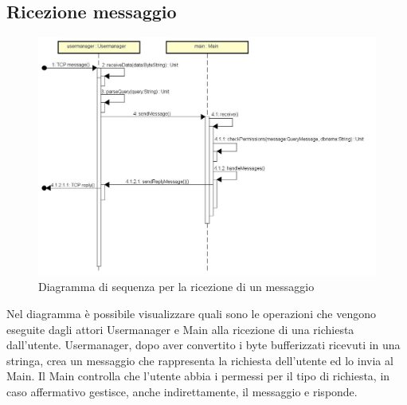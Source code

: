 \documentclass[a4paper]{article}
\begin{document}
       \subsection{Ricezione messaggio}
	\begin{figure}[H]
			\centering
			\includegraphics[width=\textwidth]{Sequenza/seqComandoUtente.jpg}
			\caption{Diagramma di sequenza per la ricezione di un messaggio}
		\end{figure}
		Nel diagramma è possibile visualizzare quali sono le operazioni che vengono eseguite dagli
attori Usermanager e Main alla ricezione di una richiesta dall'utente. Usermanager, dopo aver convertito
i byte bufferizzati ricevuti in una stringa, crea un messaggio che rappresenta la richiesta dell'utente ed lo invia al
Main. Il Main controlla che l'utente abbia i permessi per il tipo di richiesta, in caso affermativo gestisce,
anche indirettamente, il messaggio e risponde.
\end{document}

